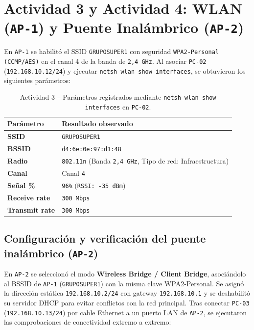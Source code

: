 \documentclass[11pt, a4paper]{article}
\begin{document}
\section{Actividad 3 y Actividad 4: WLAN (\texttt{AP-1}) y Puente Inalámbrico (\texttt{AP-2})}

En \texttt{AP-1} se habilitó el SSID \texttt{GRUPOSUPER1} con seguridad \texttt{WPA2-Personal (CCMP/AES)} en el canal 4 de la banda de \texttt{2,4 GHz}. Al asociar \texttt{PC-02} (\texttt{192.168.10.12/24}) y ejecutar \texttt{netsh wlan show interfaces}, se obtuvieron los siguientes parámetros:

\begin{table}[h!]
\centering
\small
\setlength{\tabcolsep}{5pt}
\caption{Actividad 3 -- Parámetros registrados mediante \texttt{netsh wlan show interfaces} en \texttt{PC-02}.}
\begin{tabularx}{\textwidth}{>{\bfseries}l >{\raggedright\arraybackslash}X}
\toprule
Parámetro & Resultado observado \\
\midrule
SSID & \texttt{GRUPOSUPER1} \\
BSSID & \texttt{d4:6e:0e:97:d1:48} \\
Radio & \texttt{802.11n} (Banda \texttt{2,4 GHz}, Tipo de red: Infraestructura) \\
Canal & Canal \texttt{4} \\
Señal \% & \texttt{96\%} (\texttt{RSSI: -35 dBm}) \\
Receive rate & \texttt{300 Mbps} \\
Transmit rate & \texttt{300 Mbps} \\
\bottomrule
\end{tabularx}
\end{table}

\subsection*{Configuración y verificación del puente inalámbrico (\texttt{AP-2})}
En \texttt{AP-2} se seleccionó el modo \textbf{Wireless Bridge / Client Bridge}, asociándolo al BSSID de \texttt{AP-1} (\texttt{GRUPOSUPER1}) con la misma clave WPA2-Personal. Se asignó la dirección estática \texttt{192.168.10.2/24} con gateway \texttt{192.168.10.1} y se deshabilitó su servidor DHCP para evitar conflictos con la red principal. Tras conectar \texttt{PC-03} (\texttt{192.168.10.13/24}) por cable Ethernet a un puerto LAN de \texttt{AP-2}, se ejecutaron las comprobaciones de conectividad extremo a extremo:
\end{document}
